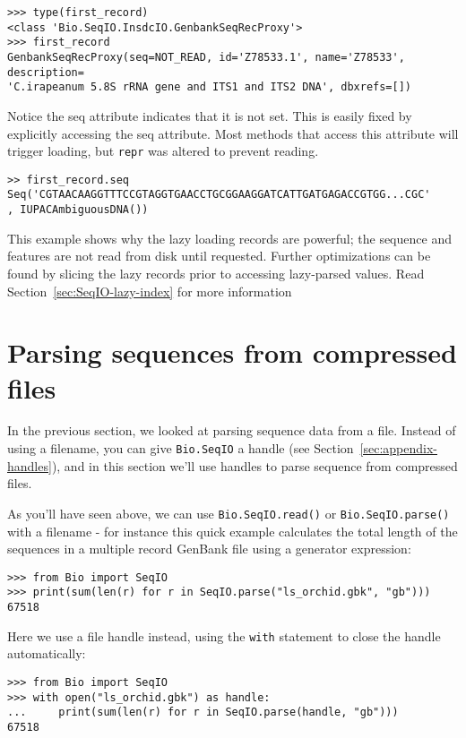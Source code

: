 \documentclass{report}
\begin{document}
\begin{verbatim}
>>> type(first_record)
<class 'Bio.SeqIO.InsdcIO.GenbankSeqRecProxy'>
>>> first_record
GenbankSeqRecProxy(seq=NOT_READ, id='Z78533.1', name='Z78533', description=
'C.irapeanum 5.8S rRNA gene and ITS1 and ITS2 DNA', dbxrefs=[])
\end{verbatim}

Notice the seq attribute indicates that it is not set. This is easily fixed
by explicitly accessing the seq attribute. Most methods that access this
attribute will trigger loading, but \verb|repr| was altered to prevent reading.

\begin{verbatim}
>> first_record.seq
Seq('CGTAACAAGGTTTCCGTAGGTGAACCTGCGGAAGGATCATTGATGAGACCGTGG...CGC'
, IUPACAmbiguousDNA())
\end{verbatim}

This example shows why the lazy loading records are powerful; the sequence and
features are not read from disk until requested. Further optimizations can
be found by slicing the lazy records prior to accessing lazy-parsed values.
Read Section~\ref{sec:SeqIO-lazy-index} for more information

\section{Parsing sequences from compressed files}
\label{sec:SeqIO_compressed}
In the previous section, we looked at parsing sequence data from a file.
Instead of using a filename, you can give \verb|Bio.SeqIO| a handle
(see Section~\ref{sec:appendix-handles}), and in this section
we'll use handles to parse sequence from compressed files.

As you'll have seen above, we can use \verb|Bio.SeqIO.read()| or
\verb|Bio.SeqIO.parse()| with a filename - for instance this quick
example calculates the total length of the sequences in a multiple
record GenBank file using a generator expression:

\begin{verbatim}
>>> from Bio import SeqIO
>>> print(sum(len(r) for r in SeqIO.parse("ls_orchid.gbk", "gb")))
67518
\end{verbatim}

\noindent
Here we use a file handle instead, using the \verb|with| statement
to close the handle automatically:

\begin{verbatim}
>>> from Bio import SeqIO
>>> with open("ls_orchid.gbk") as handle:
...     print(sum(len(r) for r in SeqIO.parse(handle, "gb")))
67518
\end{verbatim}
\end{document}
